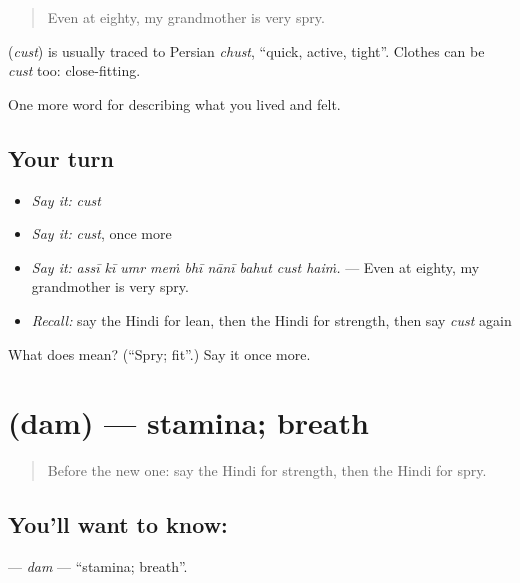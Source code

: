 \begin{quote}
Even at eighty, my grandmother is very spry.
\end{quote}

\begin{cousinweb}
\textbf{} (\emph{cust}) is usually traced to Persian \emph{chust}, \textquotedblleft{}quick, active, tight\textquotedblright{}. Clothes can be \emph{cust} too: close-fitting.
\end{cousinweb}

\begin{grammarlens}[title={What you've built}]
One more word for describing what you lived and felt.
\end{grammarlens}

\subsection*{Your turn}
\begin{itemize}
\raggedright
  \item \emph{Say it:} \emph{cust}
  \item \emph{Say it:} \emph{cust}, once more
  \item \emph{Say it:} \emph{assī kī umr meṁ bhī nānī bahut cust haiṁ.} — Even at eighty, my grandmother is very spry.
  \item \emph{Recall:} say the Hindi for lean, then the Hindi for strength, then say \emph{cust} again
\end{itemize}

\begin{tcolorbox}[breakable,colback=teal!4,colframe=teal!35!black,title={Before you move on}]
What does  mean? (\textquotedblleft{}Spry; fit\textquotedblright{}.) Say it once more.
\end{tcolorbox}
\section[\texorpdfstring{\hi{दम} (dam)}{दम (dam)}]{ (dam) — stamina; breath}

\label{lesson:HI-C483-dam}



\begin{quote}
Before the new one: say the Hindi for strength, then the Hindi for spry.
\end{quote}

\subsection*{You'll want to know: }
\textbf{} — \emph{dam} — \textquotedblleft{}stamina; breath\textquotedblright{}.

